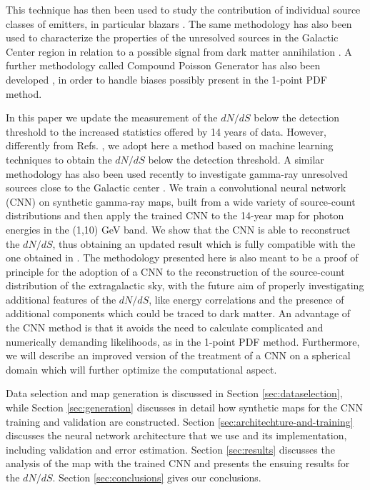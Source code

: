 This technique has then been used to study the contribution of individual source classes of emitters, in particular blazars \cite{Korsmeier:2022cwp,Manconi:2019ynl,DiMauro:2017ing,Zechlin:2017uzo}.
The same methodology has also been used to characterize the properties of the unresolved sources in the Galactic Center region in relation to a possible signal from dark matter annihilation \cite{Mishra-Sharma:2016gis,Bariuan:2022phe,Lee:2014mza,Lee:2015fea,Linden:2016rcf,Leane:2019xiy,Chang:2019ars,Buschmann:2020adf,Leane:2020nmi,Leane:2020pfc}.
{  A further methodology called Compound Poisson Generator has also been developed \cite{Collin:2021ufc}, in order to handle biases possibly present in the 1-point PDF method.}


In this paper we update the measurement of the $dN/dS$ below the detection threshold to the increased statistics offered by 14 years of \fermi data. However, differently from Refs. \cite{Cuoco-1pdf,Zechlin:2016pme}, we adopt here a method based on machine learning techniques to obtain the $dN/dS$ below the detection threshold. 
A similar methodology has also been used recently to investigate gamma-ray unresolved sources close to the Galactic center \cite{Mishra-Sharma:2021oxe,List:2021aer,List:2020mzd}.  
We train a convolutional neural network (CNN) on synthetic gamma-ray maps, built from a wide variety of source-count distributions and then apply the trained CNN to the  14-year \fermi map for photon energies in the (1,10) GeV band. We show that the CNN is able to reconstruct the $dN/dS$, thus obtaining an updated result which is fully compatible with the one obtained in \cite{Cuoco-1pdf}. The methodology presented here is also meant to be a proof of principle for the adoption of a CNN to the reconstruction of the source-count distribution of the extragalactic sky, with the future aim of properly investigating additional features of the $dN/dS$, like energy correlations and the presence of additional components which could be traced to dark matter.
{  An advantage of the CNN method is that it
avoids the need to calculate complicated and numerically demanding likelihoods, as in the 1-point PDF method.
Furthermore, we will describe an improved version of the treatment of a CNN on a spherical domain which will further optimize the computational aspect.}


Data selection and \fermi map generation is discussed in Section \ref{sec:dataselection}, while Section \ref{sec:generation} discusses in detail how synthetic maps for the CNN training and validation are constructed. Section \ref{sec:architechture-and-training} discusses the neural network architecture that we use and its implementation, including validation and error estimation. Section \ref{sec:results} discusses the analysis of the \fermi map with the trained CNN and presents the ensuing results for the $dN/dS$. Section \ref{sec:conclusions} gives our conclusions.





